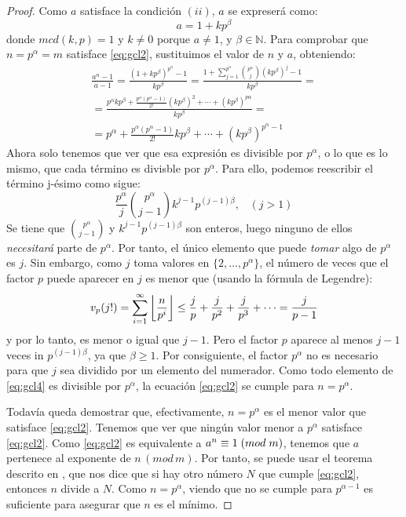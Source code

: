 \begin{proof}
Como $a$ satisface la condición $(ii)$, $a$ se expreserá como:
\begin{equation}\label{eq:gcl3}
a=1+kp^\beta
\end{equation}
donde $mcd(k,p)=1$ y $k\neq 0$ porque $a\neq 1$, y $\beta\in\mathbb{N}$. Para comprobar que $n=p^\alpha=m$ satisface \eqref{eq:gcl2}, sustituimos el valor de $n$ y $a$, obteniendo:
\begin{multline}\label{eq:gcl4}
\frac{a^n-1}{a-1}=\frac{(1+kp^\beta)^{p^\alpha}-1}{kp^\beta}=\frac{1+\sum_{j=1}^{p^\alpha}\binom{p^\alpha}{j}(kp^\beta)^j-1}{kp^\beta}= \\
= \frac{p^\alpha kp^\beta+\frac{p^\alpha(p^\alpha-1)}{2!}(kp^\beta)^2+\cdots+(kp^\beta)^{p\alpha}}{kp^\beta} = \\
=p^\alpha+\frac{p^\alpha(p^\alpha-1)}{2!}kp^\beta+\cdots+(kp^\beta)^{p^\alpha-1}
\end{multline}
Ahora solo tenemos que ver que esa expresión es divisible por $p^\alpha$, o lo que es lo mismo, que cada término es divisble por $p^\alpha$.  Para ello, podemos reescribir el término j-ésimo como sigue:
\[
\frac{p^\alpha}{j} \binom{p^\alpha}{j-1} k^{j-1}p^{(j-1)\beta}, \;\;\; (j>1)
\]
Se tiene que $\binom{p^\alpha}{j-1}$ y $k^{j-1}p^{(j-1)\beta}$ son enteros, luego ninguno de ellos \textit{necesitará} parte de $p^\alpha$. Por tanto, el único elemento que puede \textit{tomar} algo de $p^\alpha$ es $j$. Sin embargo, como $j$ toma valores en $\{2, \ldots, p^\alpha\}$, el número de veces que el factor $p$ puede aparecer en $j$ es menor que (usando la fórmula de Legendre):
\begin{equation}\label{eq:gcl6}
v_p(j!)=\sum_{i=1}^\infty\left\lfloor\frac{n}{p^i}\right\rfloor\leq\frac{j}{p}+\frac{j}{p^2}+\frac{j}{p^3}+\cdots=\frac{j}{p-1}
\end{equation}
y por lo tanto, es menor o igual que $j-1$. Pero el factor $p$ aparece al menos $j-1$ veces in $p^{(j-1)\beta}$, ya que $\beta\geq 1$. Por consiguiente, el factor $p^\alpha$ no es necesario para que $j$ sea dividido por un elemento del numerador. Como todo elemento de \eqref{eq:gcl4} es divisible por $p^\alpha$, la ecuación \eqref{eq:gcl2} se cumple para $n=p^\alpha$.

Todavía queda demostrar que, efectivamente, $n=p^\alpha$ es el menor valor que satisface \eqref{eq:gcl2}. Tenemos que ver que ningún valor menor a $p^\alpha$ satisface \eqref{eq:gcl2}. Como \eqref{eq:gcl2} es equivalente a $a^n \equiv 1 \;(mod \; m)$, tenemos que $a$ pertenece al exponente de $n\,(mod\, m)$.  Por tanto, se puede usar el teorema descrito en \cite{ore1988number}, que nos dice que si hay otro número $N$ que cumple \eqref{eq:gcl2}, entonces $n$ divide a $N$. Como $n=p^\alpha$, viendo que no se cumple para $p^{\alpha-1}$ es suficiente para asegurar que $n$ es el mínimo.


\end{proof}
